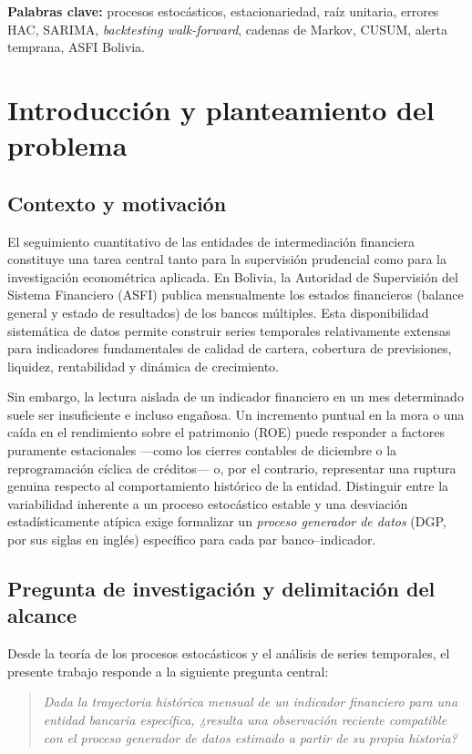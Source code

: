 \documentclass[11pt,letterpaper]{article}
\begin{document}
\textbf{Palabras clave:} procesos estocásticos, estacionariedad, raíz unitaria, errores HAC, SARIMA, \emph{backtesting walk-forward}, cadenas de Markov, CUSUM, alerta temprana, ASFI Bolivia.

\newpage
\tableofcontents
\newpage

\section{Introducción y planteamiento del problema}

\subsection{Contexto y motivación}

El seguimiento cuantitativo de las entidades de intermediación financiera constituye una tarea central tanto para la supervisión prudencial como para la investigación econométrica aplicada. En Bolivia, la Autoridad de Supervisión del Sistema Financiero (ASFI) publica mensualmente los estados financieros (balance general y estado de resultados) de los bancos múltiples. Esta disponibilidad sistemática de datos permite construir series temporales relativamente extensas para indicadores fundamentales de calidad de cartera, cobertura de previsiones, liquidez, rentabilidad y dinámica de crecimiento.

Sin embargo, la lectura aislada de un indicador financiero en un mes determinado suele ser insuficiente e incluso engañosa. Un incremento puntual en la mora o una caída en el rendimiento sobre el patrimonio (ROE) puede responder a factores puramente estacionales —como los cierres contables de diciembre o la reprogramación cíclica de créditos— o, por el contrario, representar una ruptura genuina respecto al comportamiento histórico de la entidad. Distinguir entre la variabilidad inherente a un proceso estocástico estable y una desviación estadísticamente atípica exige formalizar un \emph{proceso generador de datos} (DGP, por sus siglas en inglés) específico para cada par banco--indicador.

\subsection{Pregunta de investigación y delimitación del alcance}

Desde la teoría de los procesos estocásticos y el análisis de series temporales, el presente trabajo responde a la siguiente pregunta central:
\begin{quote}
\emph{Dada la trayectoria histórica mensual de un indicador financiero para una entidad bancaria específica, ¿resulta una observación reciente compatible con el proceso generador de datos estimado a partir de su propia historia?}
\end{quote}
\end{document}
